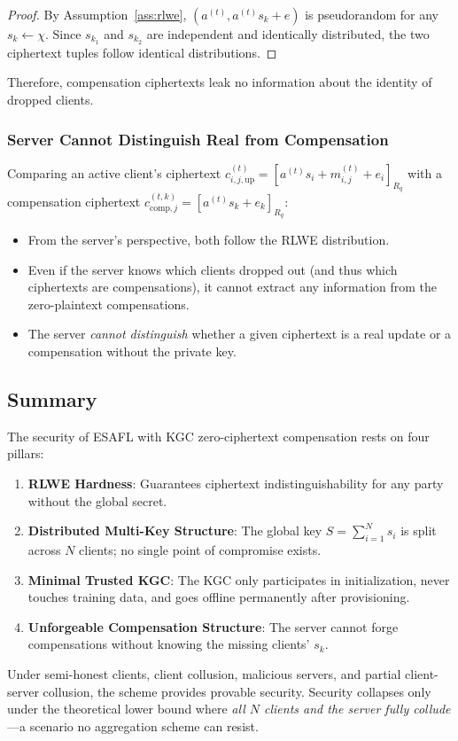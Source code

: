 \begin{proof}
By Assumption~\ref{ass:rlwe}, $(a^{(t)}, a^{(t)} s_k + e)$ is pseudorandom for any $s_k \gets \chi$. Since $s_{k_1}$ and $s_{k_2}$ are independent and identically distributed, the two ciphertext tuples follow identical distributions.
\end{proof}

Therefore, compensation ciphertexts leak no information about the identity of dropped clients.

\subsubsection{Server Cannot Distinguish Real from Compensation}

Comparing an active client's ciphertext $c_{i,j,\mathrm{up}}^{(t)} = [a^{(t)} s_i + m_{i,j}^{(t)} + e_i]_{R_q}$ with a compensation ciphertext $c_{\mathrm{comp},j}^{(t,k)} = [a^{(t)} s_k + e_k]_{R_q}$:
\begin{itemize}
    \item From the server's perspective, both follow the RLWE distribution.
    \item Even if the server knows which clients dropped out (and thus which ciphertexts are compensations), it cannot extract any information from the zero-plaintext compensations.
    \item The server \emph{cannot distinguish} whether a given ciphertext is a real update or a compensation without the private key.
\end{itemize}

\subsection{Summary}
\label{ssec:summary}

The security of ESAFL with KGC zero-ciphertext compensation rests on four pillars:
\begin{enumerate}
    \item \textbf{RLWE Hardness}: Guarantees ciphertext indistinguishability for any party without the global secret.
    \item \textbf{Distributed Multi-Key Structure}: The global key $S = \sum_{i=1}^{N} s_i$ is split across $N$ clients; no single point of compromise exists.
    \item \textbf{Minimal Trusted KGC}: The KGC only participates in initialization, never touches training data, and goes offline permanently after provisioning.
    \item \textbf{Unforgeable Compensation Structure}: The server cannot forge compensations without knowing the missing clients' $s_k$.
\end{enumerate}

Under semi-honest clients, client collusion, malicious servers, and partial client-server collusion, the scheme provides provable security. Security collapses only under the theoretical lower bound where \emph{all $N$ clients and the server fully collude}---a scenario no aggregation scheme can resist.
